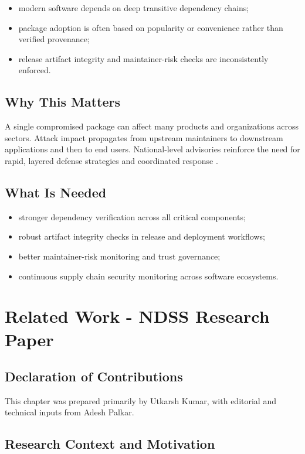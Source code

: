 \begin{itemize}
\item modern software depends on deep transitive dependency chains;
\item package adoption is often based on popularity or convenience rather than verified provenance;
\item release artifact integrity and maintainer-risk checks are inconsistently enforced.
\end{itemize}

\section{Why This Matters}

A single compromised package can affect many products and organizations across sectors.
Attack impact propagates from upstream maintainers to downstream applications and then to end users.
National-level advisories reinforce the need for rapid, layered defense strategies and coordinated
response \citep{cisa2024shieldsup}.

\section{What Is Needed}

\begin{itemize}
\item stronger dependency verification across all critical components;
\item robust artifact integrity checks in release and deployment workflows;
\item better maintainer-risk monitoring and trust governance;
\item continuous supply chain security monitoring across software ecosystems.
\end{itemize}

\chapter{Related Work - NDSS Research Paper}
\label{ch:related-ndss}

\section*{Declaration of Contributions}
This chapter was prepared primarily by Utkarsh Kumar,
with editorial and technical inputs from Adesh Palkar.

\section{Research Context and Motivation}

